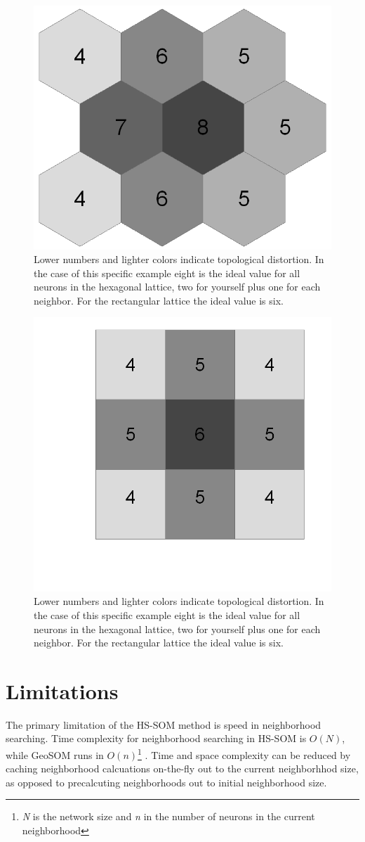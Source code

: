 \documentclass[11pt]{article}
\begin{document}
\begin{figure}
\centering
\includegraphics[width=0.4\linewidth]{figure_hex.png}
\caption{Lower numbers and lighter colors indicate topological distortion.
In the case of this specific example eight is the ideal value for all neurons
in the hexagonal lattice, two for yourself plus one for each neighbor.  For
the rectangular lattice the ideal value is six.}
\label{figure2}
\end{figure}

\begin{figure}
\centering
\includegraphics[width=0.4\linewidth]{figure_rect.png}
\caption{Lower numbers and lighter colors indicate topological distortion.  In
the case of this specific example eight is the ideal value for all neurons in
the hexagonal lattice, two for yourself plus one for each neighbor.  For the
rectangular lattice the ideal value is six.}
\label{figure3}
\end{figure}

\section{Limitations}
The primary limitation of the HS-SOM method is speed in neighborhood
searching. Time complexity for neighborhood searching in HS-SOM is
\begin{math}O(N)\end{math}, while GeoSOM runs in
\begin{math}O(n)\end{math}\footnote{\textit{N} is the network size and
\textit{n} in the number of neurons in the current
neighborhood} \citep{Wu:2006lr}. Time and space complexity can be reduced by
caching neighborhood calcuations on-the-fly out to the current neighborhhod
size, as opposed to precalcuting neighborhoods out to initial neighborhood
size.
\end{document}
